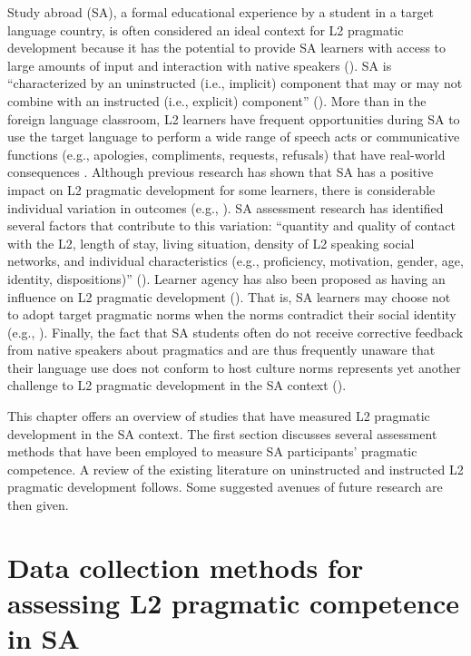 \documentclass[output=paper]{langscibook}
\begin{document}
Study abroad (SA), a formal educational experience by a student in a target language country, is often considered an ideal context for L2 pragmatic development because it has the potential to provide SA learners with access to large amounts of input and interaction with native speakers (\citealt{Hernández2010,Ren2018,VandeBergLou2012}). SA is “characterized by an uninstructed (i.e., implicit) component that may or may not combine with an instructed (i.e., explicit) component” (\citealt[1]{Sanz2014}). More than in the foreign language classroom, L2 learners have frequent opportunities during SA to use the target language to perform a wide range of speech acts or communicative functions (e.g., apologies, compliments, requests, refusals) that have real-world consequences \citep{Shively2011}. Although previous research has shown that SA has a positive impact on L2 pragmatic development for some learners, there is considerable individual variation in outcomes (e.g., \citealt{Barron2006,Bataller2010,Félix-BrasdeferHasler-Barker2015,Hernández2018b,ShivelyCohen2008}). SA assessment research has identified several factors that contribute to this variation: “quantity and quality of contact with the L2, length of stay, living situation, density of L2 speaking social networks, and individual characteristics (e.g., proficiency, motivation, gender, age, identity, dispositions)” (\citealt[355]{PérezVidalShively2019}). Learner agency has also been proposed as having an influence on L2 pragmatic development (\citealt{LoCastro2003,LoCastro2012}). That is, SA learners may choose not to adopt target pragmatic norms when the norms contradict their social identity (e.g., \citealt{Bataller2010}). Finally, the fact that SA students often do not receive corrective feedback from native speakers about pragmatics and are thus frequently unaware that their language use does not conform to host culture norms represents yet another challenge to L2 pragmatic development in the SA context (\citealt{HernándezBoero2018b,Shively2010}).

This chapter offers an overview of studies that have measured L2 pragmatic development in the SA context. The first section discusses several assessment methods that have been employed to measure SA participants’ pragmatic competence. A review of the existing literature on uninstructed and instructed L2 pragmatic development follows. Some suggested avenues of future research are then given.

\section{Data collection methods for assessing L2 pragmatic competence in SA}
\end{document}
